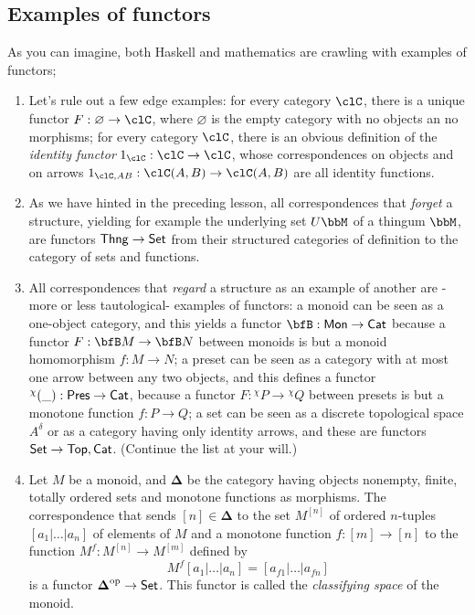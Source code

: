 \documentclass[11pt]{article}
\begin{document}
\subsection{Examples of functors}
As you can imagine, both Haskell and mathematics are crawling with examples of functors;
\begin{example}\leavevmode
	\begin{enumerate}
		\item  Let's rule out a few edge examples: for every category $\clC$, there is a unique functor $F : \varnothing \to \clC$, where $\varnothing$ is the empty category with no objects an no morphisms; for every category $\clC$, there is an obvious definition of the \emph{identity functor} $1_\clC : \clC \to \clC$, whose correspondences on objects and on arrows $1_{\clC, AB} : \clC(A,B) \to \clC(A,B)$ are all identity functions.
		\item  As we have hinted in the preceding lesson, all correspondences that \emph{forget} a structure, yielding for example the underlying set $U\bbM$ of a thingum $\bbM$, are functors ${\sf Thng} \to {\sf Set}$ from their structured categories of definition to the category of sets and functions.
		\item  All correspondences that \emph{regard} a structure as an example of another are -more or less tautological- examples of functors: a monoid can be seen as a one-object category, and this yields a functor $\bfB : {\sf Mon} \to {\sf Cat}$ because a functor $F : \bfB M \to \bfB N$ between monoids is but a monoid homomorphism $f : M \to N$; a preset can be seen as a category with at most one arrow between any two objects, and this defines a functor $^\chi(\_) : {\sf Pres} \to {\sf Cat}$, because a functor $F : {}^\chi P \to {}^\chi Q$ between presets is but a monotone function $f : P \to Q$; a set can be seen as a discrete topological space $A^\delta$ or as a category having only identity arrows, and these are functors ${\sf Set}\to {\sf Top}, {\sf Cat}$. (Continue the list at your will.)
		\item  Let $M$ be a monoid, and $\boldsymbol{\Delta}$ be the category having objects nonempty, finite, totally ordered sets and monotone functions as morphisms. The correspondence that sends $[n]\in\boldsymbol{\Delta}$ to the set $M^{[n]}$ of ordered $n$-tuples $[a_1|\dots|a_n]$ of elements of $M$ and a monotone function $f : [m]\to [n]$ to the function $M^f : M^{[n]}\to M^{[m]}$ defined by
		\[ M^f[a_1|\dots|a_n] = [a_{f1}|\dots|a_{fn}] \]
		is a functor $\boldsymbol{\Delta}^{\text{op}} \to \mathsf{Set}$. This functor is called the \emph{classifying space} of the monoid.

\end{enumerate}
\end{example}
\end{document}
